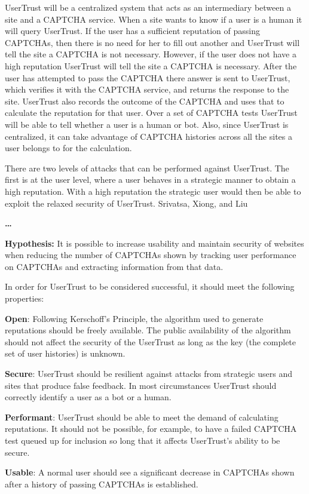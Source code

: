 \documentclass[journal, 12pt, onecolumn, draftclsnofoot]{IEEEtran}
\begin{document}
UserTrust will be a centralized system that acts as an intermediary between a site and a CAPTCHA service. When a site wants to know if a user is a human it will query UserTrust. If the user has a sufficient reputation of passing CAPTCHAs, then there is no need for her to fill out another and UserTrust will tell the site a CAPTCHA is not necessary. However, if the user does not have a high reputation UserTrust will tell the site a CAPTCHA is necessary. After the user has attempted to pass the CAPTCHA there answer is sent to UserTrust, which verifies it with the CAPTCHA service, and returns the response to the site. UserTrust also records the outcome of the CAPTCHA and uses that to calculate the reputation for that user. Over a set of CAPTCHA tests UserTrust will be able to tell whether a user is a human or bot. Also, since UserTrust is centralized, it can take advantage of CAPTCHA histories across all the sites a user belongs to for the calculation.

There are two levels of attacks that can be performed against UserTrust. The first is at the user level, where a user behaves in a strategic manner to obtain a high reputation. With a high reputation the strategic user would then be able to exploit the relaxed security of UserTrust. Srivatsa, Xiong, and Liu \cite{srivatsa}

\textbf{\ldots}

\textbf{Hypothesis:} It is possible to increase usability and maintain security of websites when reducing the number of CAPTCHAs shown by tracking user performance on CAPTCHAs and extracting information from that data.

In order for UserTrust to be considered successful, it should meet the following properties:
\begin{description}
  \item \textbf{Open}: Following Kerschoff's Principle, the algorithm used to generate reputations should be freely available. The public availability of the algorithm should not affect the security of the UserTrust as long as the key (the complete set of user histories) is unknown.
  \item \textbf{Secure}: UserTrust should be resilient against attacks from strategic users and sites that produce false feedback. In most circumstances UserTrust should correctly identify a user as a bot or a human.
  \item \textbf{Performant}: UserTrust should be able to meet the demand of calculating reputations. It should not be possible, for example, to have a failed CAPTCHA test queued up for inclusion so long that it affects UserTrust's ability to be secure.
  \item \textbf{Usable}: A normal user should see a significant decrease in CAPTCHAs shown after a history of passing CAPTCHAs is established.
\end{description}
\end{document}
